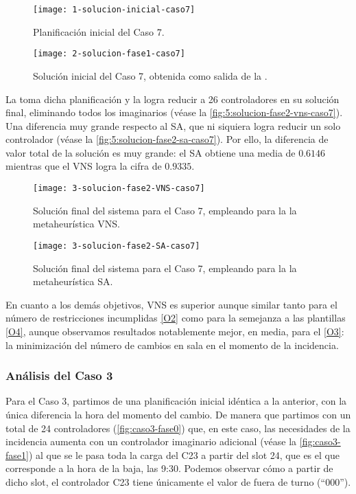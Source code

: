 \begin{figure}
	\centering
	\texttt{[image: 1-solucion-inicial-caso7]}
	\caption{Planificación inicial del Caso 7.}
	\label{fig:5:solucion-inicial-caso7}
\end{figure}

\begin{figure}
	\centering
	\texttt{[image: 2-solucion-fase1-caso7]}
	\caption{Solución inicial del Caso 7, obtenida como salida de la \faseuno{}.}
	\label{fig:5:solucion-fase1-caso7}
\end{figure}

La \fasedos{} toma dicha planificación y la logra reducir a 26 controladores en su solución final, eliminando todos los imaginarios (véase la \autoref{fig:5:solucion-fase2-vns-caso7}). Una diferencia muy grande respecto al SA, que ni siquiera logra reducir un solo controlador (véase la \autoref{fig:5:solucion-fase2-sa-caso7}). Por ello, la diferencia de valor total de la solución es muy grande: el SA obtiene una media de $0.6146$ mientras que el VNS logra la cifra de $0.9335$.

\begin{figure}
	\centering
	\texttt{[image: 3-solucion-fase2-VNS-caso7]}
	\caption{Solución final del sistema para el Caso 7, empleando para la \fasedos{} la metaheurística VNS.}
	\label{fig:5:solucion-fase2-vns-caso7}
\end{figure}

\begin{figure}
	\centering
	\texttt{[image: 3-solucion-fase2-SA-caso7]}
	\caption{Solución final del sistema para el Caso 7, empleando para la \fasedos{} la metaheurística SA.}
	\label{fig:5:solucion-fase2-sa-caso7}
\end{figure}

En cuanto a los demás objetivos, VNS es superior aunque similar tanto para el número de restricciones incumplidas \ref{O2} como para la semejanza a las plantillas \ref{O4}, aunque observamos resultados notablemente mejor, en media, para el \ref{O3}: la minimización del número de cambios en sala en el momento de la incidencia.

\subsubsection{Análisis del Caso 3}

Para el Caso 3, partimos de una planificación inicial idéntica a la anterior, con la única diferencia la hora del momento del cambio. De manera que partimos con un total de 24 controladores (\autoref{fig:caso3-fase0}) que, en este caso, las necesidades de la incidencia aumenta con un controlador imaginario adicional (véase la \autoref{fig:caso3-fase1}) al que se le pasa toda la carga del C23 a partir del slot 24, que es el que corresponde a la hora de la baja, las 9:30. Podemos observar cómo a partir de dicho slot, el controlador C23 tiene únicamente el valor de fuera de turno (``000'').

